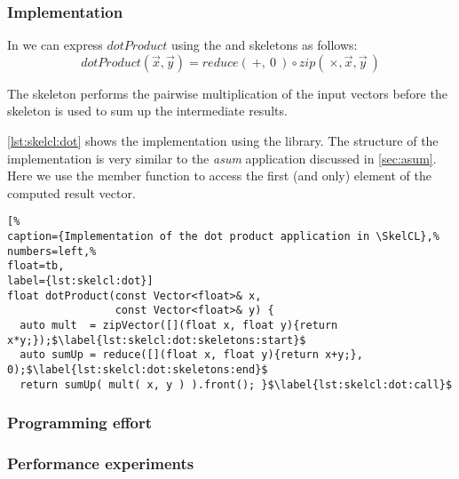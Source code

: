 \subsubsection*{\SkelCL Implementation}
In \SkelCL we can express $dotProduct$ using the \zip and \reduce skeletons as follows:
\begin{equation}
  dotProduct(\vec{x}, \vec{y}) = reduce(\ +,\ 0\ ) \circ zip(\ \times, \vec{x}, \vec{y}\ )
\end{equation}

The \zip skeleton performs the pairwise multiplication of the input vectors before the \reduce skeleton is used to sum up the intermediate results.

\autoref{lst:skelcl:dot} shows the implementation using the \SkelCL library.
The structure of the implementation is very similar to the \emph{asum} application discussed in \autoref{sec:asum}.
Here we use the  member function to access the first (and only) element of the computed result vector.

\begin{lstlisting}[%                                                             
caption={Implementation of the dot product application in \SkelCL},%
numbers=left,%
float=tb,
label={lst:skelcl:dot}]
float dotProduct(const Vector<float>& x,
                 const Vector<float>& y) {
  auto mult  = zipVector([](float x, float y){return x*y;});$\label{lst:skelcl:dot:skeletons:start}$
  auto sumUp = reduce([](float x, float y){return x+y;}, 0);$\label{lst:skelcl:dot:skeletons:end}$
  return sumUp( mult( x, y ) ).front(); }$\label{lst:skelcl:dot:call}$
\end{lstlisting}

\subsubsection*{Programming effort}

\subsubsection*{Performance experiments}



